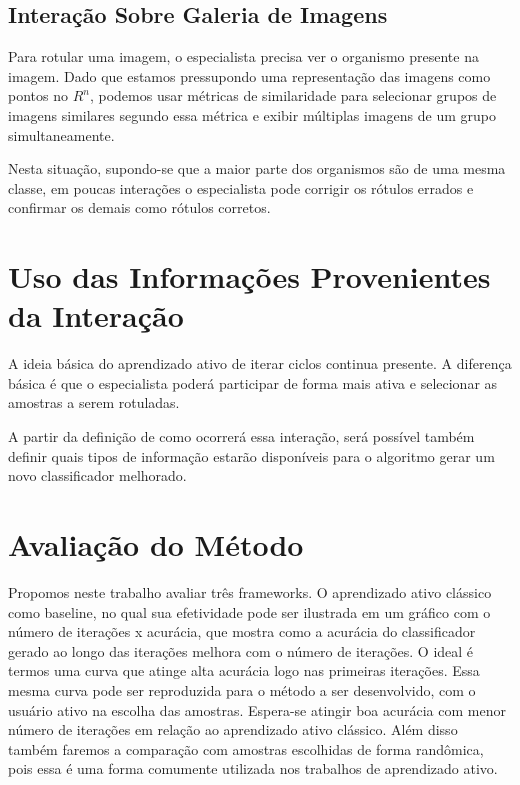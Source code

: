 \subsection{Interação Sobre Galeria de Imagens} 
\label{sec:galeria_imagens}

Para rotular uma imagem, o especialista precisa ver o organismo presente na imagem. Dado que estamos pressupondo uma representação  das imagens como pontos no $R^
n$, podemos usar métricas de similaridade para selecionar grupos de imagens similares segundo essa métrica e exibir múltiplas imagens de um grupo simultaneamente.
 
Nesta situação, supondo-se que a maior parte dos organismos são de uma mesma classe, em poucas interações o especialista pode corrigir os rótulos errados e confirmar os demais como rótulos corretos. 


\section{Uso das Informações Provenientes da Interação}
\label{sec:uso_das_informacoes_interacao}

A ideia básica do aprendizado ativo de iterar ciclos continua presente. A diferença básica é que o especialista poderá participar de forma mais ativa e selecionar as amostras a serem rotuladas.

A partir da definição de como ocorrerá essa interação, será possível também definir quais tipos de informação estarão disponíveis para o algoritmo gerar um novo classificador melhorado.



\section{Avaliação do Método}
\label{sec:avaliação do método}

Propomos neste trabalho avaliar três frameworks. O aprendizado ativo clássico como baseline, no qual sua efetividade pode ser ilustrada em um gráfico com o número de iterações x acurácia, que mostra como a acurácia do classificador gerado ao longo das iterações melhora com o número de iterações. O ideal é termos uma curva que atinge alta acurácia logo nas primeiras iterações. Essa mesma curva pode ser reproduzida para o método a ser desenvolvido, com o usuário ativo na escolha das amostras. Espera-se atingir boa acurácia com menor número de iterações em relação ao aprendizado ativo clássico. Além disso também faremos a comparação com amostras escolhidas de forma randômica, pois essa é uma forma comumente utilizada nos trabalhos de aprendizado ativo.

